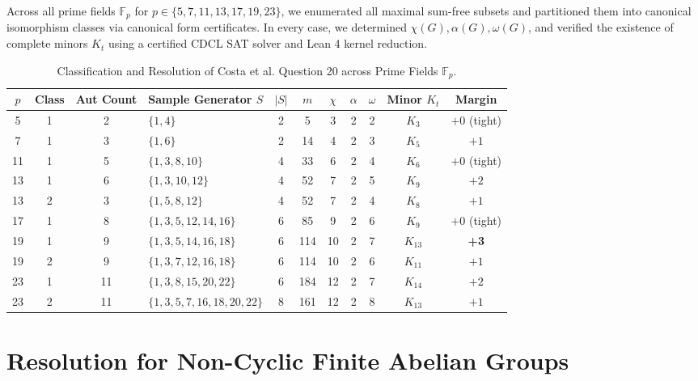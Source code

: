 \documentclass[11pt,a4paper]{article}
\theoremstyle{definition}
\begin{document}
Across all prime fields $\mathbb{F}_p$ for $p \in \{5, 7, 11, 13, 17, 19, 23\}$, we enumerated all maximal sum-free subsets and partitioned them into canonical isomorphism classes via canonical form certificates. In every case, we determined $\chi(G), \alpha(G), \omega(G)$, and verified the existence of complete minors $K_t$ using a certified CDCL SAT solver and Lean 4 kernel reduction.

\begin{table}[ht]
\centering
\caption{Classification and Resolution of Costa et al. Question 20 across Prime Fields $\mathbb{F}_p$.}
\label{tab:costa_results}
\small
\begin{tabular}{ccclccccccc}
\toprule
$p$ & Class & Aut Count & Sample Generator $S$ & $|S|$ & $m$ & $\chi$ & $\alpha$ & $\omega$ & Minor $K_t$ & Margin \\
\midrule
5  & 1 & 2  & $\{1, 4\}$                     & 2 & 5   & 3  & 2 & 2 & $K_3$  & $+0$ (tight) \\
7  & 1 & 3  & $\{1, 6\}$                     & 2 & 14  & 4  & 2 & 3 & $K_5$  & $+1$ \\
11 & 1 & 5  & $\{1, 3, 8, 10\}$              & 4 & 33  & 6  & 2 & 4 & $K_6$  & $+0$ (tight) \\
13 & 1 & 6  & $\{1, 3, 10, 12\}$             & 4 & 52  & 7  & 2 & 5 & $K_9$  & $+2$ \\
13 & 2 & 3  & $\{1, 5, 8, 12\}$              & 4 & 52  & 7  & 2 & 4 & $K_8$  & $+1$ \\
17 & 1 & 8  & $\{1, 3, 5, 12, 14, 16\}$      & 6 & 85  & 9  & 2 & 6 & $K_9$  & $+0$ (tight) \\
19 & 1 & 9  & $\{1, 3, 5, 14, 16, 18\}$      & 6 & 114 & 10 & 2 & 7 & $K_{13}$ & \textbf{+3} \\
19 & 2 & 9  & $\{1, 3, 7, 12, 16, 18\}$      & 6 & 114 & 10 & 2 & 6 & $K_{11}$ & $+1$ \\
23 & 1 & 11 & $\{1, 3, 8, 15, 20, 22\}$      & 6 & 184 & 12 & 2 & 7 & $K_{14}$ & $+2$ \\
23 & 2 & 11 & $\{1, 3, 5, 7, 16, 18, 20, 22\}$ & 8 & 161 & 12 & 2 & 8 & $K_{13}$ & $+1$ \\
\bottomrule
\end{tabular}
\end{table}

\section{Resolution for Non-Cyclic Finite Abelian Groups}
\end{document}
